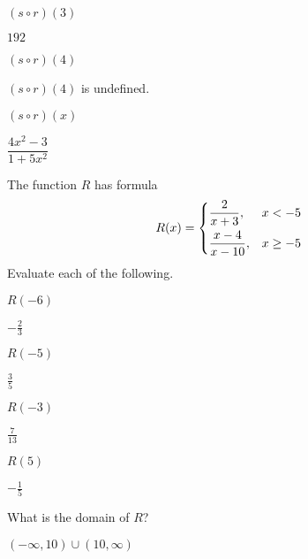 \begin{exercises}
\begin{problem}[Composition]
\begin{multicols}{3}
\begin{subproblem}
	\end{subproblem}
	\begin{subproblem}
		$(s\circ r)(3)$
		\begin{shortsolution}
			$192$
		\end{shortsolution}
	\end{subproblem}
	\begin{subproblem}
		$(s\circ r)(4)$
		\begin{shortsolution}
			$(s\circ r)(4)$ is undefined.
		\end{shortsolution}
	\end{subproblem}
	\begin{subproblem}
		$(s\circ r)(x)$
		\begin{shortsolution}
			$\dfrac{4x^2-3}{1+5x^2}$
		\end{shortsolution}
	\end{subproblem}
\end{multicols}
\end{problem}
\begin{problem}
The function $R$ has formula
\[
	R(x)=
	\begin{dcases}
		\frac{2}{x+3},    & x<-5     \\
		\frac{x-4}{x-10}, & x\geq -5
	\end{dcases}
\]
Evaluate each of the following.
\begin{multicols}{4}
	\begin{subproblem}
		$R(-6)$
		\begin{shortsolution}
			$-\frac{2}{3}$
		\end{shortsolution}
	\end{subproblem}
	\begin{subproblem}
		$R(-5)$
		\begin{shortsolution}
			$\frac{3}{5}$
		\end{shortsolution}
	\end{subproblem}
	\begin{subproblem}
		$R(-3)$
		\begin{shortsolution}
			$\frac{7}{13}$
		\end{shortsolution}
	\end{subproblem}
	\begin{subproblem}
		$R(5)$
		\begin{shortsolution}
			$-\frac{1}{5}$
		\end{shortsolution}
	\end{subproblem}
\end{multicols}
\begin{subproblem}
	What is the domain of $R$?
	\begin{shortsolution}
		$(-\infty,10)\cup(10,\infty)$
	\end{shortsolution}
\end{subproblem}
\end{problem}
\end{exercises}

